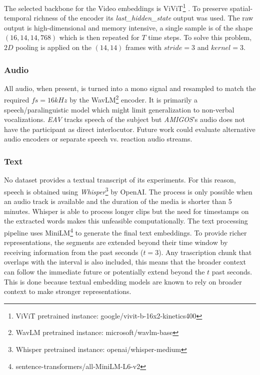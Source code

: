 The selected backbone for the Video embeddings is ViViT\footnote{ViViT pretrained instance: google/vivit-b-16x2-kinetics400} \cite{arnab2021vivitvideovisiontransformer}.
To preserve spatial-temporal richness of the encoder its \textit{last\_hidden\_state} output was used.
The raw output is high-dimensional and memory intensive, a single sample is of the shape $(16, 14, 14, 768)$ which is then repeated for $T$ time steps.
To solve this problem, $2D$ pooling is applied on the $(14,14)$ frames with $stride=3$ and $kernel=3$.

\subsubsection{Audio}
All audio, when present, is turned into a mono signal and resampled to match the required $fs=16kHz$ by the WavLM\footnote{WavLM pretrained instance: microsoft/wavlm-base} \cite{Chen_2022} encoder.
It is primarily a speech/paralinguistic model which might limit generalization to non-verbal vocalizations.
\textit{EAV} tracks speech of the subject but \textit{AMIGOS}'s audio does not have the participant as direct interlocutor.
Future work could evaluate alternative audio encoders or separate speech vs. reaction audio streams.

\subsubsection{Text}
No dataset provides a textual transcript of its experiments.
For this reason, speech is obtained using \textit{Whisper}\footnote{Whisper pretrained instance: openai/whisper-medium} by OpenAI\cite{radford2022robustspeechrecognitionlargescale}.
The process is only possible when an audio track is available and the duration of the media is shorter than 5 minutes.
Whisper is able to process longer clips but the need for timestamps on the extracted words makes this unfeasible computationally.
The text processing pipeline uses MiniLM\footnote{sentence-transformers/all-MiniLM-L6-v2}\cite{wang2020minilmdeepselfattentiondistillation} to generate the final text embeddings.
To provide richer representations, the segments are extended beyond their time window
by receiving information from the past seconds ($t=3$).
Any trascription chunk that overlaps with the interval is also included, this means that the broader context can follow the immediate future or potentially extend beyond the $t$ past seconds.
This is done because textual embedding models are known to rely on broader context to make stronger representations. %

